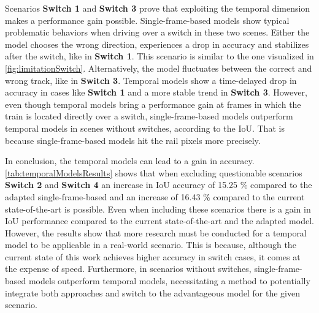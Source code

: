 Scenarios \textbf{Switch 1} and \textbf{Switch 3} prove that exploiting the temporal dimension makes a performance gain possible.
Single-frame-based models show typical problematic behaviors when driving over a switch in these two scenes.
Either the model chooses the wrong direction, experiences a drop in accuracy and stabilizes after the switch, like in \textbf{Switch 1}.
This scenario is similar to the one visualized in \autoref{fig:limitationSwitch}.
Alternatively, the model fluctuates between the correct and wrong track, like in \textbf{Switch 3}.
Temporal models show a time-delayed drop in accuracy in cases like \textbf{Switch 1} and a more stable trend in \textbf{Switch 3}.
However, even though temporal models bring a performance gain at frames in which the train is located directly over a switch, single-frame-based models outperform temporal models in scenes without switches, according to the \ac{IoU}.
That is because single-frame-based models hit the rail pixels more precisely.

In conclusion, the temporal models can lead to a gain in accuracy.
\autoref{tab:temporalModelsResults} shows that when excluding questionable scenarios \textbf{Switch 2} and \textbf{Switch 4} an increase in IoU accuracy of 15.25 \% compared to the adapted single-frame-based and an increase of 16.43 \% compared to the current state-of-the-art is possible.
Even when including these scenarios there is a gain in IoU performance compared to the current state-of-the-art and the adapted model.
However, the results show that more research must be conducted for a temporal model to be applicable in a real-world scenario.
This is because, although the current state of this work achieves higher accuracy in switch cases, it comes at the expense of speed.
Furthermore, in scenarios without switches, single-frame-based models outperform temporal models, necessitating a method to potentially integrate both approaches and switch to the advantageous model for the given scenario.